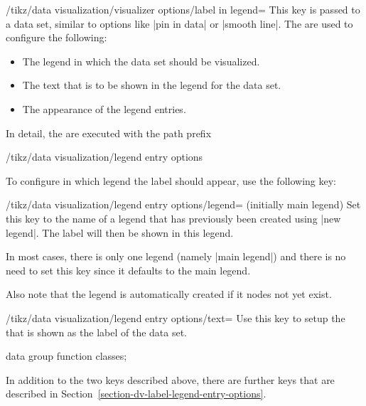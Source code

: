 \begin{key}{/tikz/data visualization/visualizer options/label in legend=}
  This key is passed to a data set, similar to options like
  |pin in data| or |smooth line|. The  are used to
  configure the following:
  \begin{itemize}
  \item The legend in which the data set should be visualized.
  \item The text that is to be shown in the legend for the data set.
  \item The appearance of the legend entries.
  \end{itemize}
  In detail, the  are executed with the path prefix
\begin{codeexample}
/tikz/data visualization/legend entry options
\end{codeexample}
  To configure in which legend the label should appear, use the
  following key:
  \begin{key}{/tikz/data visualization/legend entry
      options/legend= (initially main legend)}
    Set this key to the name of a legend that has previously been
    created using |new legend|. The label will then be shown in this
    legend. 

    In most cases, there is only one legend (namely |main legend|) and
    there is no need to set this key since it defaults to the main
    legend.

    Also note that the legend  is automatically created if
    it nodes not yet exist.
  \end{key}

  \begin{key}{/tikz/data visualization/legend entry options/text=}
    Use this key to setup the  that is shown as the label
    of the data set. 

\begin{codeexample}[width=8cm]
\tikz \datavisualization [
  scientific axes, x axis={label=$x$},
  visualize as smooth line/.list=
    {log, lin, squared, exp},
  log=    {label in legend={text=$\log x$}},
  lin=    {label in legend={text=$x/2$}},
  squared={pin in data    ={text=$x^2$, pos=0.1}},
  exp=    {label in data  ={text=$e^x$}},
  style sheet=vary dashing]
data group {function classes};
\end{codeexample}  
  \end{key}
  
  In addition to the two keys described above, there are further
  keys that are described in
  Section~\ref{section-dv-label-legend-entry-options}.
\end{key}


